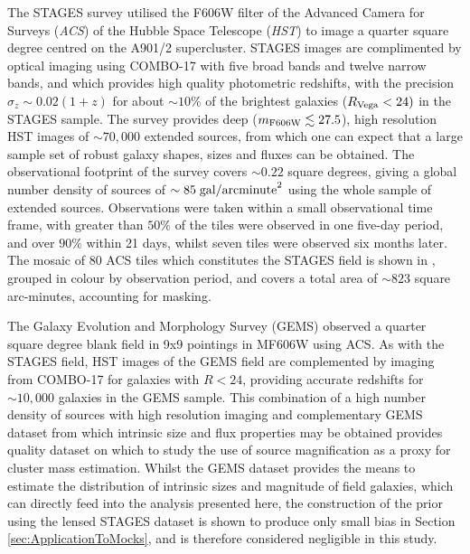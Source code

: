 \documentclass[useAMS,usenatbib,times,letter,amssymb]{mn2e}
\begin{document}
The STAGES survey \citep{Gray:2009p2720} utilised the F606W filter of the Advanced Camera for Surveys ({\it ACS}) of the Hubble Space Telescope ({\it HST}) to image a quarter square degree centred on the A901/2 supercluster. STAGES images are complimented by optical imaging using COMBO-17 \citep{Wolf:2003p2805} with five broad bands and twelve narrow bands, and which provides high quality photometric redshifts, with the precision $\sigma_z \sim 0.02(1+z)$ for about $\sim 10\%$ of the brightest galaxies ($R_{\rm Vega}<24)$ in the STAGES sample. The survey provides deep ($m_{\rm F606W} \lesssim 27.5$), high resolution HST images of $\sim 70,000$ extended sources, from which one can expect that a large sample set of robust galaxy shapes, sizes and fluxes can be obtained. The observational footprint of the survey covers $\sim 0.22$ square degrees, giving a global number density of sources of $\sim 85 \; {\rm gal/arcminute}^2$ using the whole sample of extended sources. Observations were taken within a small observational time frame, with greater than $50\%$ of the tiles were observed in one five-day period, and over $90\%$ within 21 days, whilst seven tiles were observed six months later.  The mosaic of 80 ACS tiles which constitutes the STAGES field is shown in \cite{Heymans:2008p2060}, grouped in colour by observation period, and covers a total area of $\sim 823$ square arc-minutes, accounting for masking.

The Galaxy Evolution and Morphology Survey (GEMS) \citep{Rix:2004p2800} observed a quarter square degree blank field in 9x9 pointings in MF606W using ACS. As with the STAGES field, HST images of the GEMS field are complemented by imaging from COMBO-17 for galaxies with $R<24$, providing accurate redshifts for $\sim 10,000$ galaxies in the GEMS sample. This combination of a high number density of sources with high resolution imaging and complementary GEMS dataset from which intrinsic size and flux properties may be obtained provides quality dataset on which to study the use of source magnification as a proxy for cluster mass estimation. Whilst the GEMS dataset provides the means to estimate the distribution of intrinsic sizes and magnitude of field galaxies, which can directly feed into the analysis presented here, the construction of the prior using the lensed STAGES dataset is shown to produce only small bias in Section \ref{sec:ApplicationToMocks}, and is therefore considered negligible in this study.
\end{document}
